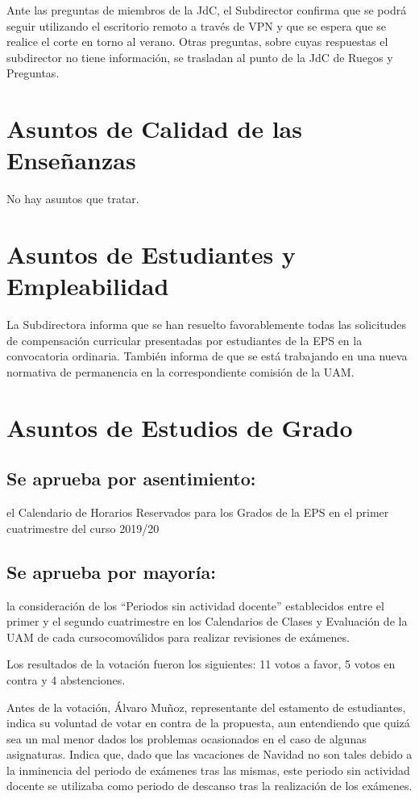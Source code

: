 \documentclass[numerado]{plantillasEPS} %
\begin{document}
Ante las preguntas de miembros de la JdC, el Subdirector confirma que se podrá seguir utilizando el escritorio remoto a través de VPN y que se espera que se realice el corte en torno  al  verano.  Otras  preguntas,  sobre  cuyas respuestas  el  subdirector  no  tiene información, se trasladan al punto de la JdC de Ruegos y Preguntas. 

\section{Asuntos de Calidad de las Enseñanzas}

No hay asuntos que tratar. 

\section{Asuntos de Estudiantes y Empleabilidad}
La  Subdirectora  informa  que  se  han  resuelto favorablemente  todas  las  solicitudes  de compensación   curricular   presentadas   por   estudiantes   de   la   EPS   en   la   convocatoria ordinaria.  También  informa  de  que  se  está  trabajando  en  una  nueva  normativa  de permanencia en la correspondiente comisión de la UAM.

\section{Asuntos de Estudios de Grado}
\subsection{Se aprueba por asentimiento:} el Calendario de Horarios Reservados para los Grados de la EPS en el primer cuatrimestre del curso 2019/20
\subsection{Se   aprueba   por   mayoría:} la  consideración  de  los  “Periodos  sin  actividad docente” establecidos entre el primer y el segundo cuatrimestre en los Calendarios de Clases y Evaluación de la UAM de cada cursocomoválidos para realizar revisiones de exámenes. 

Los resultados de la votación fueron los siguientes: 11 votos a favor, 5 votos en contra y 4 abstenciones. 

Antes  de  la  votación, Álvaro  Muñoz,  representante  del  estamento  de  estudiantes, indica su voluntad de votar en contra de la propuesta, aun entendiendo que quizá sea un  mal menor  dados  los  problemas  ocasionados  en  el  caso  de  algunas  asignaturas. Indica  que,  dado  que  las vacaciones  de Navidad  no  son tales  debido  a  la  inminencia del  periodo  de  exámenes  tras  las  mismas,  este  periodo  sin  actividad  docente  se utilizaba como periodo de descanso tras la realización de los exámenes. 
\end{document}
